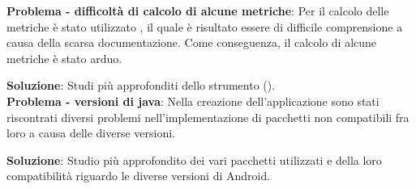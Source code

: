 \textbf{Problema - difficoltà di calcolo di alcune metriche}: Per il calcolo delle metriche è stato utilizzato , il quale è risultato essere di difficile comprensione a causa della scarsa documentazione. Come conseguenza, il calcolo di alcune metriche è stato arduo.

\textbf{Soluzione}: Studi più approfonditi dello strumento ().\\

\textbf{Problema - versioni di java}: Nella creazione dell'applicazione sono stati riscontrati diversi problemi nell'implementazione di pacchetti non compatibili fra loro a causa delle diverse versioni.

\textbf{Soluzione}: Studio più approfondito dei vari pacchetti utilizzati e della loro compatibilità riguardo le diverse versioni di Android.


